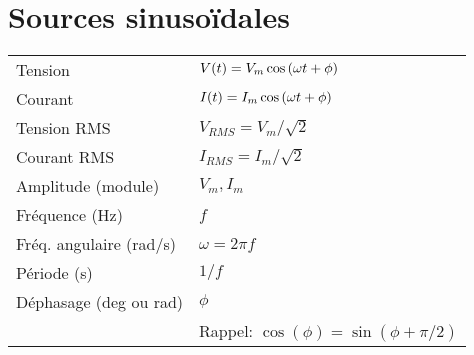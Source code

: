 \section{Sources sinusoïdales}
\begin{tabular}{ll}
    Tension & \(V(t) = V_m \cos\qty(\omega t + \phi) \) \\
    Courant & \(I(t) = I_m \cos\qty(\omega t + \phi) \)\\\hline
    Tension RMS & \( V_{RMS}= V_m/\sqrt{2} \)\\
    Courant RMS & \(I_{RMS} = I_m/\sqrt{2}\)\\\hline
    Amplitude (module) & $V_m,I_m$ \\
    Fréquence (Hz) & $f$\\
    Fréq. angulaire (rad/s)  & $\omega = 2\pi f$ \\
    Période (s) & $1/f$\\
    Déphasage (deg ou rad) & $\phi$ \\
    & Rappel: $\cos(\phi)=\sin(\phi + \pi/2)$
\end{tabular}
